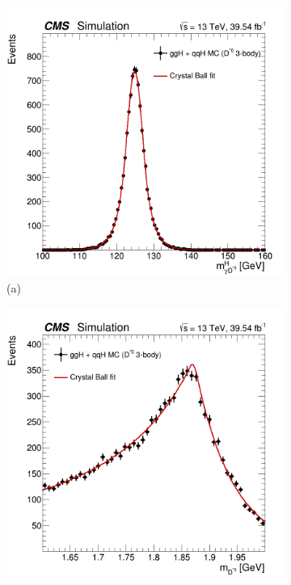 \begin{figure}[!ht]
    \captionsetup[subfigure]{labelformat=empty}
    \vspace*{-0.2cm}
    \centering
    \setlength{\mylength}{\textwidth}
    \begin{subfigure}[t]{0.50\mylength}
        \centering
        \includegraphics[width=0.49\mylength]{resources/plots/D0Star_3body_fit_SGN_MH.png}
        \vspace*{-0.2cm}
        \caption{\footnotesize (a)}
    \end{subfigure}%
    \begin{subfigure}[t]{0.50\mylength}
        \centering
        \includegraphics[width=0.49\mylength]{resources/plots/D0Star_3body_fit_SGN_MM.png}

\end{subfigure}
\end{figure}
